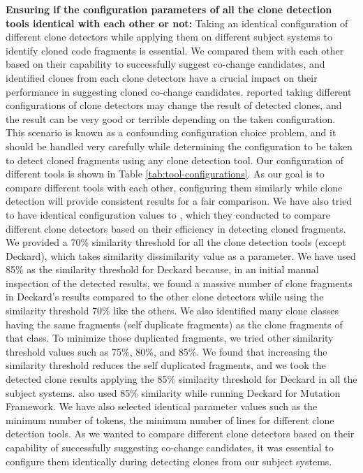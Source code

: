 \documentclass[review]{elsarticle}
\begin{document}
\vspace{1mm}
\textbf{Ensuring if the configuration parameters of all the clone detection tools identical with each other or not:} Taking an identical configuration of different clone detectors while applying them on different subject systems to identify cloned code fragments is essential. We compared them with each other based on their capability to successfully suggest co-change candidates, and identified clones from each clone detectors have a crucial impact on their performance in suggesting cloned co-change candidates. \citet{Wang-2013-SBC-2491411-2491420} reported taking different configurations of clone detectors may change the result of detected clones, and the result can be very good or terrible depending on the taken configuration. This scenario is known as a confounding configuration choice problem, and it should be handled very carefully while determining the configuration to be taken to detect cloned fragments using any clone detection tool. 
Our configuration of different tools is shown in Table \ref{tab:tool-configurations}. As our goal is to compare different tools with each other, configuring them similarly while clone detection will provide consistent results for a fair comparison. We have also tried to have identical configuration values to \citet{jeff-evaluating}, which they conducted to compare different clone detectors based on their efficiency in detecting cloned fragments. We provided a 70\% similarity threshold for all the clone detection tools (except Deckard), which takes similarity dissimilarity value as a parameter. We have used 85\% as the similarity threshold for Deckard because, in an initial manual inspection of the detected results, we found a massive number of clone fragments in Deckard's results compared to the other clone detectors while using the similarity threshold 70\% like the others. We also identified many clone classes having the same fragments (self duplicate fragments) as the clone fragments of that class. To minimize those duplicated fragments, we tried other similarity threshold values such as 75\%, 80\%, and  85\%. We found that increasing the similarity threshold reduces the self duplicated fragments, and we took the detected clone results applying the 85\% similarity threshold for Deckard in all the subject systems. \citet{jeff-evaluating} also used 85\% similarity while running Deckard for Mutation Framework. We have also selected identical parameter values such as the minimum number of tokens, the minimum number of lines for different clone detection tools. As we wanted to compare different clone detectors based on their capability of successfully suggesting co-change candidates, it was essential to configure them identically during detecting clones from our subject systems.
\end{document}
